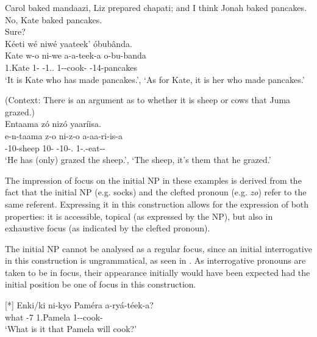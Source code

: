 \documentclass[output=paper]{langscibook}
\begin{document}
\ea
\label{bkm:Ref116287297}
\begin{xlist}
 Carol baked mandaazi, Liz prepared chapati; and I think Jonah baked pancakes.\\
 No, Kate baked pancakes.\\
 Sure? \\
Kéeti wé niwé yaateek’  óbubânda.\\
\gll
Kate  w-o  ni-we  a-a-teek-a  o-bu-banda\\
1.Kate  1-\CM{}  \COP{}-1.\REL{}.\PRO{}  1\SM{}-\PST{}-cook-\FV{}  \AUG{}-14-pancakes\\
\glt
‘It is Kate who has made pancakes.’, ‘As for Kate, it is her who made pancakes.’

\end{xlist}
\z

\ea
\label{bkm:Ref116287506}
(Context: There is an argument as to whether it is sheep or cows that Juma grazed.)\\
Entaama zó nizó yaaríisa.\\
\gll
e-n-taama  z-o  ni-z-o  a-aa-ri-is-a\\
\AUG{}-10-sheep  10-\CM{}  \COP{}-10-\REL{}.\PRO{}  1\SM{}-\N{}.\PST{}-{}eat-\CAUS{}-\FV{}\\
\glt
‘He has (only) grazed the sheep.’, ‘The sheep, it’s them that he grazed.’\\


\z


The impression of focus on the initial NP in these examples is derived from the fact that the initial NP (e.g. socks) and the clefted pronoun (e.g. \textit{zo}) refer to the same referent. Expressing it in this construction allows for the expression of both properties: it is accessible, topical (as expressed by the NP), but also in exhaustive focus (as indicated by the clefted pronoun).

The initial NP cannot be analysed as a regular focus, since an initial interrogative in this construction is ungrammatical, as seen in . As interrogative pronouns are taken to be in focus, their appearance initially would have been expected had the initial position be one of focus in this construction.

\ea
\label{bkm:Ref98947909}
\ea
[*]{
\gll
Enki/ki  ni-kyo  Paméra  a-ryá-téek-a? \\
what  \COP{}-7\PRO{}  1.Pamela  1\SM{}-\FUT{}-cook-\FV{}\\
\glt
‘What is it that Pamela will cook?’\\
}
\end{document}
